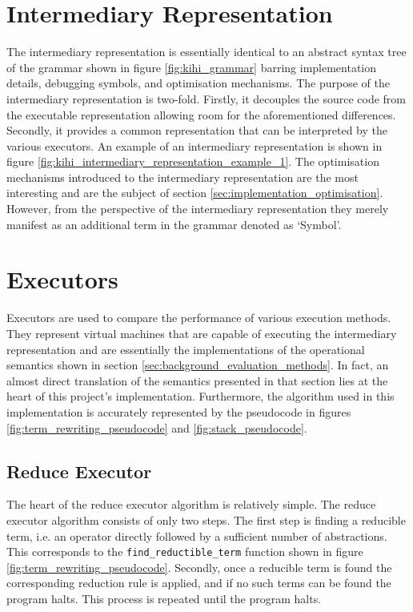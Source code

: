 \section{Intermediary Representation}\label{sec:implementation_intermediary_representation}
The intermediary representation is essentially identical to an abstract syntax tree of the grammar shown in figure \ref{fig:kihi_grammar} barring implementation details, debugging symbols, and optimisation mechanisms. The purpose of the intermediary representation is two-fold. Firstly, it decouples the source code from the executable representation allowing room for the aforementioned differences. Secondly, it provides a common representation that can be interpreted by the various executors. An example of an intermediary representation is shown in figure \ref{fig:kihi_intermediary_representation_example_1}. The optimisation mechanisms introduced to the intermediary representation are the most interesting and are the subject of section \ref{sec:implementation_optimisation}. However, from the perspective of the intermediary representation they merely manifest as an additional term in the grammar denoted as `Symbol'.




\section{Executors}\label{sec:implementation_executors}
Executors are used to compare the performance of various execution methods. They represent virtual machines that are capable of executing the intermediary representation and are essentially the implementations of the operational semantics shown in section \ref{sec:background_evaluation_methods}. In fact, an almost direct translation of the semantics presented in that section lies at the heart of this project's implementation. Furthermore, the algorithm used in this implementation is accurately represented by the pseudocode in figures \ref{fig:term_rewriting_pseudocode} and \ref{fig:stack_pseudocode}.

\subsection{Reduce Executor}


The heart of the reduce executor algorithm is relatively simple. The reduce executor algorithm consists of only two steps. The first step is finding a reducible term, i.e. an operator directly followed by a sufficient number of abstractions. This corresponds to the \lstinline{find_reductible_term} function shown in figure \ref{fig:term_rewriting_pseudocode}. Secondly, once a reducible term is found the corresponding reduction rule is applied, and if no such terms can be found the program halts. This process is repeated until the program halts.

